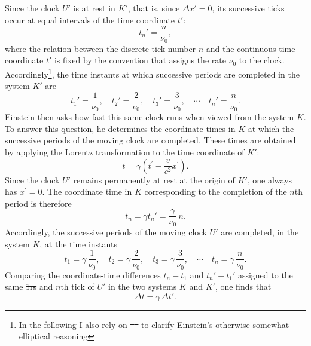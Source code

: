 \documentclass[pdflatex]{sn-jnl} %
\providecommand{\DIFadd}[1]{{\protect\color{blue}\uwave{#1}}} %
\providecommand{\DIFdel}[1]{{\protect\color{red}\sout{#1}}}                      %
\providecommand{\DIFaddbegin}{} %
\providecommand{\DIFaddend}{} %
\providecommand{\DIFdelbegin}{} %
\providecommand{\DIFdelend}{} %
\begin{document}
Since the clock $U'$ is at rest in $K'$, that is, since $\Delta x'=0$, its successive ticks occur at equal intervals of the time coordinate $t'$:
%
\begin{equation*}
t_n'=\frac{n}{\nu_0},
\end{equation*}
%
where the relation between the discrete tick number $n$ and the continuous time coordinate $t'$ is fixed by the convention that assigns the rate $\nu_0$ to the clock. Accordingly\footnote{In the following I also rely on \DIFdelbegin \DIFdel{\mbox{%
\citep[131-32]{Einstein1910} }\hskip0pt%
}\DIFdelend \DIFaddbegin \DIFadd{\mbox{%
\citealp[131--32]{Einstein1910} }\hskip0pt%
}\DIFaddend to clarify Einstein’s otherwise somewhat elliptical reasoning}, the time instants at which successive periods are completed in the system $K'$ are
%
\begin{equation*}
t_1'=\frac{1}{\nu_0}, \quad
t_2'=\frac{2}{\nu_0}, \quad
t_3'=\frac{3}{\nu_0}, \quad \cdots \quad
t_n'=\frac{n}{\nu_0}.
\end{equation*}
%
Einstein then asks how fast this same clock runs when viewed from the system $K$. To answer this question, he determines the coordinate times in $K$ at which the successive periods of the moving clock are completed. These times are obtained by applying the Lorentz transformation to the time coordinate of $K'$:
%
\begin{equation*}
t=\gamma \left(t^{\prime}-\frac{v}{c^2} x^{\prime}\right).
\end{equation*}
%
Since the clock $U'$ remains permanently at rest at the origin of $K'$, one always has $x^{\prime}=0$. The coordinate time in $K$ corresponding to the completion of the $n$th period is therefore
%
\begin{equation*}
t_n=\gamma t_n'=\frac{\gamma}{\nu_0}\,n.
\end{equation*}
%
Accordingly, the successive periods of the moving clock $U'$ are completed, in the system $K$, at the time instants
%
\begin{equation*}
t_1=\gamma\,\frac{1}{\nu_0}, \quad
t_2=\gamma\,\frac{2}{\nu_0}, \quad
t_3=\gamma\,\frac{3}{\nu_0}, \quad \cdots \quad
t_n=\gamma\,\frac{n}{\nu_0}.
\end{equation*}
%
Comparing the coordinate-time differences $t_n-t_1$ and $t_n'-t_1'$ assigned to the same \DIFdelbegin \DIFdel{1rs }\DIFdelend \DIFaddbegin \DIFadd{first }\DIFaddend and $n$th tick of $U'$ in the two systems $K$ and $K'$, one finds that
%
\begin{equation*}
\Delta t=\gamma\,\Delta t'.
\end{equation*}
\end{document}
